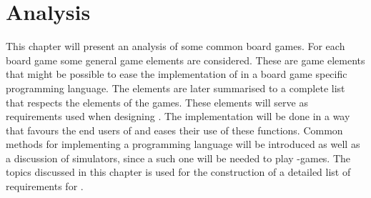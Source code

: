 \chapter{Analysis}
This chapter will present an analysis of some common board games. For each board game some general game elements are considered. These are game elements that might be possible to ease the implementation of in a board game specific programming language. The elements are later summarised to a complete list that respects the elements of the games. These elements will serve as requirements used when designing \productname{}. The implementation will be done in a way that favours the end users of \productname{} and eases their use of these functions. Common methods for implementing a programming language will be introduced as well as a discussion of simulators, since a such one will be needed to play \productname{}-games. The topics discussed in this chapter is used for the construction of a detailed list of requirements for \productname{}.









%




